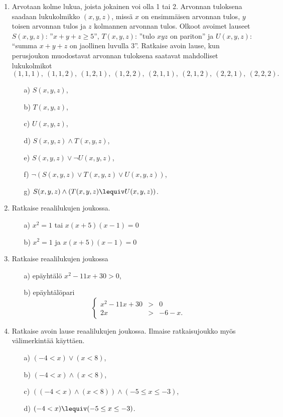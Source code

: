 \begin{enumerate}
\item
Arvotaan kolme lukua, joista jokainen voi olla 1 tai
2. Arvonnan tuloksena saadaan lukukolmikko $(x, y, z)$, missä $x$ on ensimmäisen arvonnan tulos, $y$ toisen arvonnan tulos ja $z$ kolmannen arvonnan tulos. Olkoot
avoimet lauseet $S(x, y, z)$: ''$x + y + z \ge 5$'', $T(x,
y, z)$: ''tulo $xyz$ on pariton'' ja $U(x, y, z)$: “summa
$x + y + z$ on jaollinen luvulla 3''. Ratkaise avoin
lause, kun perusjoukon muodostavat arvonnan tuloksena
saatavat mahdolliset lukukolmikot
\[
(1, 1, 1),\ (1, 1, 2),\ (1, 2, 1),\ (1, 2, 2),\ (2, 1, 1),\ (2, 1, 2),\ (2, 2, 1),\ (2, 2, 2).
\]
\begin{itemize}
\item[a)] $S(x, y, z)$,
\item[b)] $T(x, y, z)$,
\item[c)] $U(x, y, z)$,
\item[d)] $S(x, y, z) \land T(x, y, z)$,
\item[e)] $S(x, y, z) \lor \lnot U(x, y, z)$,
\item[f)] $\lnot (S(x, y, z) \lor T(x, y, z) \lor U(x, y,z))$,
\item[g)] $S(x, y, z) \land (T(x, y, z) \lequiv U(x, y, z))$.
\end{itemize}

\item
Ratkaise reaalilukujen joukossa.
\begin{itemize}
\item[a)] $x^2 = 1$ tai $x(x + 5)(x - 1) = 0$
\item[b)] $x^2 = 1$ ja $x(x + 5)(x - 1) = 0$
\end{itemize}

\item
Ratkaise reaalilukujen joukossa
\begin{itemize}
\item[a)] epäyhtälö $x^2 - 11x + 30 > 0$,
\item[b)] epäyhtälöpari
\[
\left\{
\begin{array}{rcl}
x^2 - 11x + 30 & > & 0 \\
2x & > & -6 - x.
\end{array}\right.
\]
\end{itemize}

\item Ratkaise avoin lause reaalilukujen joukossa. Ilmaise ratkaisujoukko myös välimerkintää käyttäen.
\begin{itemize}
\item[a)] $(-4 < x) \lor (x < 8)$,
\item[b)] $(-4 < x) \land (x < 8)$,
\item[c)] $((-4 < x) \land (x < 8)) \land (-5 \le x \le -3)$,
\item[d)] $(-4 < x) \lequiv (-5 \le x \le -3)$.
\end{itemize}


\end{enumerate}

